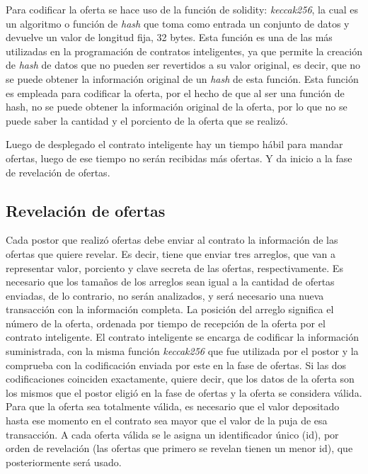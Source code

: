       Para codificar la oferta se hace uso de la función de solidity: \textit{keccak256}, la cual es un algoritmo o función de 
      \textit{hash} que toma como entrada un conjunto de datos y devuelve un valor de longitud fija, 32 bytes. 
      Esta función es una de las más utilizadas en la programación de contratos inteligentes, ya que permite la creación de 
      \textit{hash} de datos que no pueden ser revertidos a su valor original, es decir, que no se puede obtener la información original
      de un \textit{hash} de esta función. Esta función es empleada para codificar la oferta, por el hecho de que al ser una función de hash,
      no se puede obtener la información original de la oferta, por lo que no se puede saber la cantidad y el porciento de la oferta
      que se realizó.

      Luego de desplegado el contrato inteligente hay un tiempo hábil para mandar ofertas, luego de ese tiempo no serán recibidas más 
      ofertas. Y da inicio a la fase de revelación de ofertas.

      \subsection{Revelación de ofertas}
      Cada postor que realizó ofertas debe enviar al contrato la información de las ofertas que quiere revelar. Es decir, tiene que enviar
      tres arreglos, que van a representar valor, porciento y clave secreta de las ofertas, respectivamente. Es necesario que los tamaños
      de los arreglos sean igual a la cantidad de ofertas enviadas, de lo contrario, no serán analizados, y será necesario una nueva 
      transacción con la información completa. La posición del arreglo 
      significa el número de la oferta, ordenada por tiempo de recepción de la oferta por el contrato inteligente. El contrato inteligente 
      se encarga de codificar la información suministrada, con la misma función \textit{keccak256} que fue utilizada por el postor y la 
      comprueba con la codificación enviada por este en la fase de ofertas. Si las dos codificaciones coinciden exactamente, quiere decir, 
      que los datos de la oferta son los mismos que el postor eligió en la fase de ofertas y la oferta se considera válida. Para que la
      oferta sea totalmente válida, es necesario que el valor depositado hasta ese momento en el contrato sea mayor que el valor de la
      puja de esa transacción. A cada oferta válida se le asigna un identificador único (id), por orden de revelación (las ofertas que 
      primero se revelan tienen un menor id), que posteriormente será usado.

